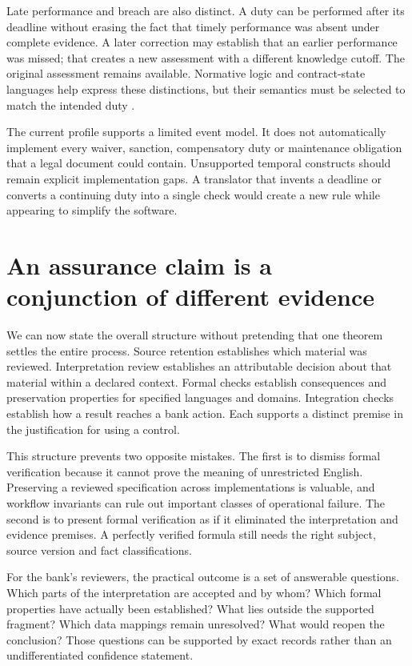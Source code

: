 Late performance and breach are also distinct. A duty can be performed after
its deadline without erasing the fact that timely performance was absent under
complete evidence. A later correction may establish that an earlier performance
was missed; that creates a new assessment with a different knowledge cutoff.
The original assessment remains available. Normative logic and contract-state
languages help express these distinctions, but their semantics must be selected
to match the intended duty \citep{violations2006,normative2016,stipula2021}.

The current profile supports a limited event model. It does not automatically
implement every waiver, sanction, compensatory duty or maintenance obligation
that a legal document could contain. Unsupported temporal constructs should
remain explicit implementation gaps. A translator that invents a deadline or
converts a continuing duty into a single check would create a new rule while
appearing to simplify the software.

\section{An assurance claim is a conjunction of different evidence}
\label{merge:M03:12}

\label{sec:proof-assurance}
We can now state the overall structure without pretending that one theorem
settles the entire process. Source retention establishes which material was
reviewed. Interpretation review establishes an attributable decision about that
material within a declared context. Formal checks establish consequences and
preservation properties for specified languages and domains. Integration checks
establish how a result reaches a bank action. Each supports a distinct premise
in the justification for using a control.

This structure prevents two opposite mistakes. The first is to dismiss formal
verification because it cannot prove the meaning of unrestricted English.
Preserving a reviewed specification across implementations is valuable, and
workflow invariants can rule out important classes of operational failure. The
second is to present formal verification as if it eliminated the interpretation
and evidence premises. A perfectly verified formula still needs the right
subject, source version and fact classifications.


For the bank's reviewers, the practical outcome is a set of answerable
questions. Which parts of the interpretation are accepted and by whom? Which
formal properties have actually been established? What lies outside the
supported fragment? Which data mappings remain unresolved? What would reopen
the conclusion? Those questions can be supported by exact records rather than
an undifferentiated confidence statement.


